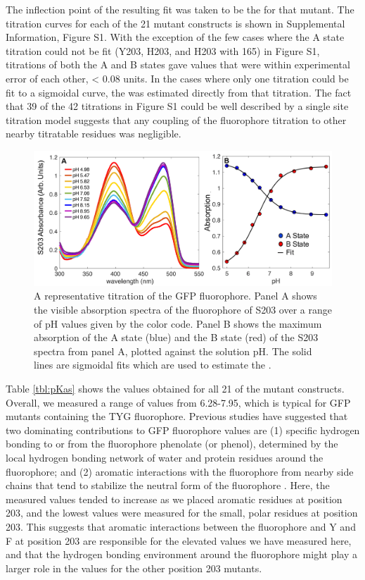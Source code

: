 The inflection point of the resulting fit was taken to be the \pKa{} for that mutant.
The titration curves for each of the 21 mutant constructs is shown in Supplemental Information, Figure S1.
With the exception of the few cases where the A state titration could not be fit (Y203, H203, and H203 with \pCNF{} 165) in Figure S1, titrations of both the A and B states gave \pKa{} values that were within experimental error of each other, < 0.08 \pKa{} units.
In the cases where only one titration could be fit to a sigmoidal curve, the \pKa{} was estimated directly from that titration.
The fact that 39 of the 42 titrations in Figure S1 could be well described by a single site titration model suggests that any coupling of the fluorophore titration to other nearby titratable residues was negligible. 

\begin{figure}
    \center
    \includegraphics[width=0.8\linewidth]{figures-gfp-pKa/absorption_titrations.png}
    \caption{A representative titration of the GFP fluorophore. Panel A shows the visible absorption spectra of the fluorophore of S203 over a range of pH values given by the color code. Panel B shows the maximum absorption of the A state (blue) and the B state (red) of the S203 spectra from panel A, plotted against the solution pH. The solid lines are sigmoidal fits which are used to estimate the \pKa{}.}
    \label{fig:abs_titrations}
\end{figure}

Table \ref{tbl:pKas} shows the \pKa{} values obtained for all 21 of the mutant constructs.
Overall, we measured a range of \pKa{} values from 6.28-7.95, which is typical for GFP mutants containing the TYG fluorophore.
Previous studies have suggested that two dominating contributions to GFP fluorophore \pKa{} values are (1) specific hydrogen bonding to or from the fluorophore phenolate (or phenol), determined by the local hydrogen bonding network of water and protein residues around the fluorophore; and (2) aromatic interactions with the fluorophore from nearby side chains that tend to stabilize the neutral form of the fluorophore \cite{Elsliger1999, Wachter1998}.
Here, the measured \pKa{} values tended to increase as we placed aromatic residues at position 203, and the lowest \pKa{} values were measured for the small, polar residues at position 203.
This suggests that aromatic interactions between the fluorophore and Y and F at position 203 are responsible for the elevated \pKa{} values we have measured here, and that the hydrogen bonding environment around the fluorophore might play a larger role in the \pKa{} values for the other position 203 mutants. 

